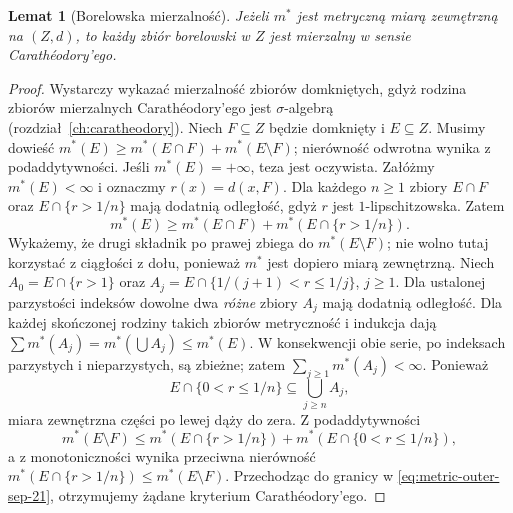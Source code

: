 \documentclass[11pt,a4paper,oneside]{book}
\numberwithin{equation}{chapter}
\theoremstyle{plain}
\newtheorem{lemat}[twierdzenie]{Lemat}
\theoremstyle{definition}
\theoremstyle{remark}
\begin{document}
\begin{lemat}[Borelowska mierzalność]
\label{lem:metric-outer-borel-21}
Jeżeli $m^*$ jest metryczną miarą zewnętrzną na $(Z,d)$,
to każdy zbiór borelowski w $Z$ jest mierzalny w sensie
Carathéodory'ego.
\end{lemat}
\begin{proof}
Wystarczy wykazać mierzalność zbiorów domkniętych, gdyż
rodzina zbiorów mierzalnych Carathéodory'ego jest
$\sigma$-algebrą (rozdział~\ref{ch:caratheodory}).
Niech $F\subseteq Z$ będzie domknięty i $E\subseteq Z$.
Musimy dowieść
$m^*(E)\ge m^*(E\cap F)+m^*(E\setminus F)$;
nierówność odwrotna wynika z podaddytywności.
Jeśli $m^*(E)=+\infty$, teza jest oczywista. Załóżmy
$m^*(E)<\infty$ i oznaczmy $r(x)=d(x,F)$.
Dla każdego $n\ge1$ zbiory $E\cap F$ oraz
$E\cap\{r>1/n\}$ mają dodatnią odległość, gdyż
$r$ jest $1$-lipschitzowska. Zatem
\begin{equation}\label{eq:metric-outer-sep-21}
 m^*(E)\ge m^*(E\cap F)+m^*(E\cap\{r>1/n\}).
\end{equation}
Wykażemy, że drugi składnik po prawej zbiega do
$m^*(E\setminus F)$; nie wolno tutaj korzystać z ciągłości
z dołu, ponieważ $m^*$ jest dopiero miarą zewnętrzną.
Niech $A_0=E\cap\{r>1\}$ oraz
$A_j=E\cap\{1/(j+1)<r\le1/j\}$, $j\ge1$.
Dla ustalonej parzystości indeksów dowolne dwa
\emph{różne} zbiory $A_j$ mają dodatnią odległość.
Dla każdej skończonej rodziny takich zbiorów metryczność
i indukcja dają
$\sum m^*(A_j)=m^*(\bigcup A_j)\le m^*(E)$.
W konsekwencji obie serie, po indeksach parzystych
i nieparzystych, są zbieżne; zatem
$\sum_{j\ge1}m^*(A_j)<\infty$. Ponieważ
\[
 E\cap\{0<r\le1/n\}\subseteq\bigcup_{j\ge n}A_j,
\]
miara zewnętrzna części po lewej dąży do zera.
Z podaddytywności
\[
 m^*(E\setminus F)\le
 m^*(E\cap\{r>1/n\})+
 m^*(E\cap\{0<r\le1/n\}),
\]
a z monotoniczności wynika przeciwna nierówność
$m^*(E\cap\{r>1/n\})\le m^*(E\setminus F)$.
Przechodząc do granicy w \eqref{eq:metric-outer-sep-21},
otrzymujemy żądane kryterium Carathéodory'ego.
\end{proof}
\end{document}
